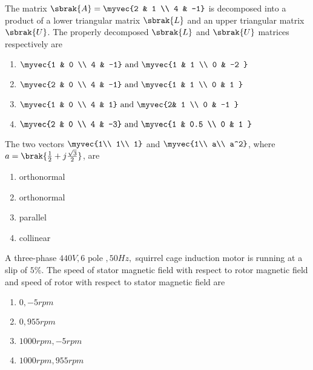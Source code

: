 \item The matrix $\sbrak{A}=\myvec{2 & 1 \\ 4 & -1}$ is decomposed into a product of a lower triangular matrix $\sbrak{L}$ and an upper triangular matrix $\sbrak{U}$. The properly decomposed $\sbrak{L}$ and $\sbrak{U}$ matrices respectively are
\begin{multicols}{2}
\begin{enumerate}
\item $\myvec{1 & 0 \\ 4 & -1} \text{ and } \myvec{1 & 1 \\ 0 & -2 }$
\item $\myvec{2 & 0 \\ 4 & -1} \text{ and } \myvec{1 & 1 \\ 0 & 1 }$
\item $\myvec{1 & 0 \\ 4 & 1} \text{ and } \myvec{2& 1 \\ 0 & -1 }$
\item $\myvec{2 & 0 \\ 4 & -3} \text{ and } \myvec{1 & 0.5 \\ 0 & 1 }$
\end{enumerate}
\end{multicols}


\item The two vectors $\myvec{1\\ 1\\ 1}$ and $\myvec{1\\ a\\ a^2}$, where $a = \brak{ \frac{1}{2} + j\frac{\sqrt{3}}{2} }$, are
\begin{multicols}{4}
\begin{enumerate}
\item orthonormal
\item  orthonormal
\item  parallel
\item  collinear
\end{enumerate}
\end{multicols}

\item A three-phase $440V, 6 \text{ pole }, 50Hz,$ squirrel cage induction motor is running at a slip of $5\%$. The speed of stator magnetic field with respect to rotor magnetic field and speed of rotor with respect to stator magnetic field are
\begin{multicols}{2}
\begin{enumerate}
\item $0, -5 rpm$
\item  $0, 955 rpm$
\item  $1000 rpm, -5 rpm$
\item $1000 rpm, 955 rpm$
\end{enumerate}
\end{multicols}



